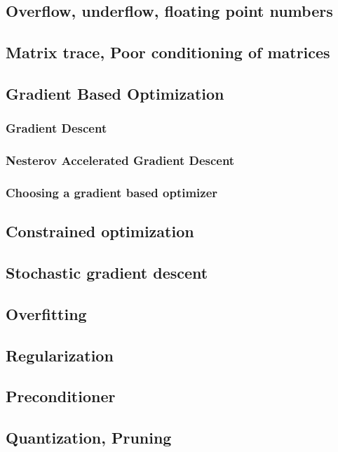 \subsection{Overflow, underflow, floating point numbers}

\subsection{Matrix trace, Poor conditioning of matrices}

\subsection{Gradient Based Optimization}
  \subsubsection{Gradient Descent}
  \subsubsection{Nesterov Accelerated Gradient Descent}
  \subsubsection{Choosing a gradient based optimizer}

\subsection{Constrained optimization}

\subsection{Stochastic gradient descent}

\subsection{Overfitting}

\subsection{Regularization}

\subsection{Preconditioner}

\subsection{Quantization, Pruning}
